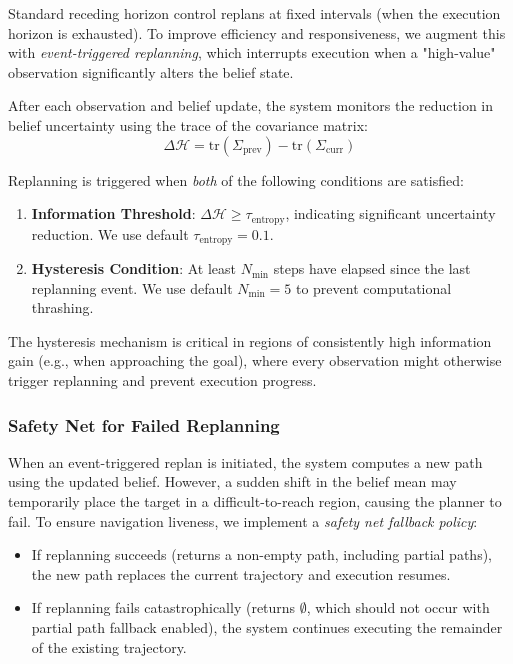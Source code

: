 Standard receding horizon control replans at fixed intervals (when the execution horizon is exhausted). To improve efficiency and responsiveness, we augment this with \emph{event-triggered replanning}, which interrupts execution when a "high-value" observation significantly alters the belief state.

After each observation and belief update, the system monitors the reduction in belief uncertainty using the trace of the covariance matrix:
\begin{equation}
    \Delta \mathcal{H} = \text{tr}(\Sigma_{\text{prev}}) - \text{tr}(\Sigma_{\text{curr}})
\end{equation}

Replanning is triggered when \emph{both} of the following conditions are satisfied:
\begin{enumerate}
    \item \textbf{Information Threshold}: $\Delta \mathcal{H} \geq \tau_{\text{entropy}}$, indicating significant uncertainty reduction. We use default $\tau_{\text{entropy}} = 0.1$.
    \item \textbf{Hysteresis Condition}: At least $N_{\text{min}}$ steps have elapsed since the last replanning event. We use default $N_{\text{min}} = 5$ to prevent computational thrashing.
\end{enumerate}

The hysteresis mechanism is critical in regions of consistently high information gain (e.g., when approaching the goal), where every observation might otherwise trigger replanning and prevent execution progress.

\subsubsection{Safety Net for Failed Replanning}

When an event-triggered replan is initiated, the system computes a new path using the updated belief. However, a sudden shift in the belief mean may temporarily place the target in a difficult-to-reach region, causing the planner to fail. To ensure navigation liveness, we implement a \emph{safety net fallback policy}:

\begin{itemize}
    \item If replanning succeeds (returns a non-empty path, including partial paths), the new path replaces the current trajectory and execution resumes.
    \item If replanning fails catastrophically (returns $\emptyset$, which should not occur with partial path fallback enabled), the system continues executing the remainder of the existing trajectory.
\end{itemize}

